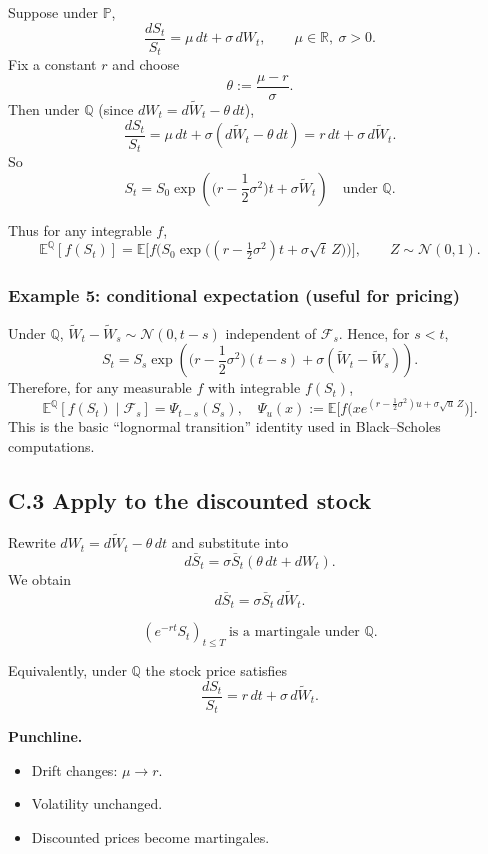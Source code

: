 \documentclass[11pt]{article}
\theoremstyle{definition}
\theoremstyle{remark}
\newcommand{\Pbb}{\mathbb{P}}
\newcommand{\Qbb}{\mathbb{Q}}
\newcommand{\E}{\mathbb{E}}
\newcommand{\R}{\mathbb{R}}
\newcommand{\F}{\mathcal{F}}
\newcommand{\1}{\mathbf{1}}
\theoremstyle{definition}
\begin{document}
Suppose under $\Pbb$,
\[
\frac{dS_t}{S_t}=\mu\,dt+\sigma\,dW_t,
\qquad \mu\in\R,\ \sigma>0.
\]
Fix a constant $r$ and choose
\[
\theta:=\frac{\mu-r}{\sigma}.
\]
Then under $\Qbb$ (since $dW_t=d\widetilde W_t-\theta\,dt$),
\[
\frac{dS_t}{S_t}
=
\mu\,dt+\sigma(d\widetilde W_t-\theta\,dt)
=
r\,dt+\sigma\,d\widetilde W_t.
\]
So
\[
S_t
=
S_0\exp\!\left(\Big(r-\frac12\sigma^2\Big)t+\sigma \widetilde W_t\right)
\quad \text{under }\Qbb.
\]

Thus for any integrable $f$,
\[
\boxed{
\;
\E^\Qbb[f(S_t)]
=
\E\Big[f\!\Big(S_0\exp\!\big((r-\tfrac12\sigma^2)t+\sigma\sqrt{t}\,Z\big)\Big)\Big],
\qquad Z\sim\mathcal N(0,1).
\;}
\]

\subsubsection*{Example 5: conditional expectation (useful for pricing)}

Under $\Qbb$, $\widetilde W_t-\widetilde W_s\sim\mathcal N(0,t-s)$ independent of $\F_s$.
Hence, for $s<t$,
\[
S_t
=
S_s\exp\!\left(\Big(r-\frac12\sigma^2\Big)(t-s)+\sigma(\widetilde W_t-\widetilde W_s)\right).
\]
Therefore, for any measurable $f$ with integrable $f(S_t)$,
\[
\boxed{
\;
\E^\Qbb[f(S_t)\mid \F_s]
=
\Psi_{t-s}(S_s),
\quad
\Psi_{u}(x):=\E\Big[f\!\big(x e^{(r-\frac12\sigma^2)u+\sigma\sqrt{u}\,Z}\big)\Big].
\;}
\]
This is the basic ``lognormal transition'' identity used in Black--Scholes computations.


\subsection*{C.3 Apply to the discounted stock}

Rewrite $dW_t=d\widetilde W_t-\theta\,dt$ and substitute into
\[
d\bar S_t=\sigma \bar S_t(\theta\,dt+dW_t).
\]
We obtain
\[
d\bar S_t=\sigma \bar S_t\,d\widetilde W_t.
\]

\[
\boxed{\quad (e^{-rt}S_t)_{t\le T}\ \text{is a martingale under }\Qbb.\quad}
\]

Equivalently, under $\Qbb$ the stock price satisfies
\[
\boxed{\quad \frac{dS_t}{S_t}=r\,dt+\sigma\,d\widetilde W_t.\quad}
\]


\textbf{Punchline.}
\begin{itemize}
\item Drift changes: $\mu \longrightarrow r$.
\item Volatility unchanged.
\item Discounted prices become martingales.
\end{itemize}
\end{document}
